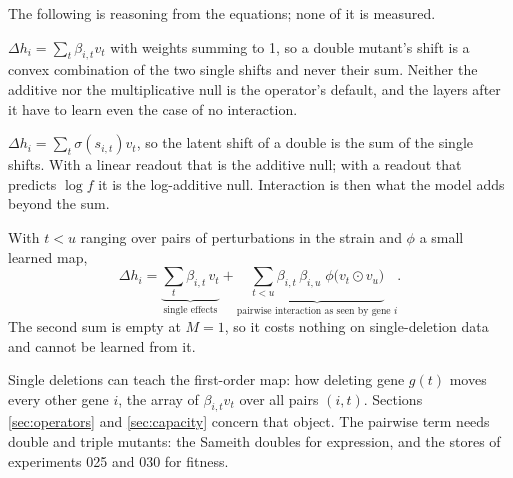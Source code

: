 The following is reasoning from the equations; none of it is measured.

 $\Delta h_i=\sum_t\beta_{i,t}v_t$ with weights summing to 1,
so a double mutant's shift is a convex combination of the two single shifts and never
their sum. Neither the additive nor the multiplicative null is the operator's default, and
the layers after it have to learn even the case of no interaction.

 $\Delta h_i=\sum_t\sigma(s_{i,t})v_t$, so the latent shift of a
double is the sum of the single shifts. With a linear readout that is the additive null;
with a readout that predicts $\log f$ it is the log-additive null. Interaction is then
what the model adds beyond the sum.

 With $t<u$ ranging over pairs
of perturbations in the strain and $\phi$ a small learned map,
\begin{equation}
\Delta h_i=\underbrace{\sum_{t}\beta_{i,t}\,v_t}_{\text{single effects}}
+\underbrace{\sum_{t<u}\beta_{i,t}\,\beta_{i,u}\;\phi\big(v_t\odot v_u\big)}_{\text{pairwise interaction as seen by gene } i}.
\label{eq:second}
\end{equation}
The second sum is empty at $M=1$, so it costs nothing on single-deletion data and cannot
be learned from it.

Single deletions can teach the first-order map: how deleting gene $g(t)$ moves every other
gene $i$, the array of $\beta_{i,t}v_t$ over all pairs $(i,t)$. Sections
\ref{sec:operators} and \ref{sec:capacity} concern that object. The pairwise term needs
double and triple mutants: the Sameith doubles for expression, and the stores of
experiments 025 and 030 for fitness.
